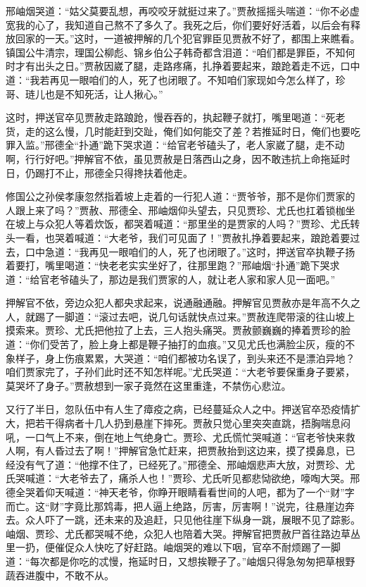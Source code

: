 \documentclass[12pt,oneside]{book}
\begin{document}
邢岫烟哭道：“姑父莫要乱想，再咬咬牙就挺过来了。”贾赦摇摇头喘道：“你不必虚宽我的心了，我知道自己熬不了多久了。我死之后，你们要好好活着，以后会有释放回家的一天。”这时，一道被押解的几个犯官罪臣见贾赦不好了，都围上来瞧看。镇国公牛清宗，理国公柳彪、锦乡伯公子韩奇都含泪道：“咱们都是罪臣，不知何时才有出头之日。”贾赦因崴了腿，走路疼痛，扎挣着要起来，踉跄着走不远，口中道：“我若再见一眼咱们的人，死了也闭眼了。不知咱们家现如今怎么样了，珍哥、琏儿也是不知死活，让人揪心。”

这时，押送官卒见贾赦走路踉跄，慢吞吞的，执起鞭子就打，嘴里喝道：“死老货，走的这么慢，几时能赶到交趾，俺们如何能交了差？若推延时日，俺们也要吃罪入监。”邢德全“扑通”跪下哭求道：“给官老爷磕头了，老人家崴了腿，走不动啊，行行好吧。”押解官不依，虽见贾赦是日落西山之身，因不敢违抗上命拖延时日，仍踢打不止，邢德全只得搀扶着他走。

修国公之孙侯孝康忽然指着坡上走着的一行犯人道：“贾爷爷，那不是你们贾家的人跟上来了吗？”贾赦、邢德全、邢岫烟仰头望去，只见贾珍、尤氏也扛着锁枷坐在坡上与众犯人等着炊饭，都哭着喊道：“那里坐的是贾家的人吗？”贾珍、尤氏转头一看，也哭着喊道：“大老爷，我们可见面了！”贾赦扎挣着要起来，踉跄着要过去，口中急道：“我再见一眼咱们的人，死了也闭眼了。”这时，押送官卒执鞭子扬着要打，嘴里喝道：“快老老实实坐好了，往那里跑？”邢岫烟“扑通”跪下哭求道：“给官老爷磕头了，那边是我们贾家的人，就让老人家和家人见一面吧。”

押解官不依，旁边众犯人都央求起来，说通融通融。押解官见贾赦亦是年高不久之人，就踢了一脚道：“滚过去吧，说几句话就快点过来。”贾赦连爬带滚的往山坡上摸索来。贾珍、尤氏把他拉了上去，三人抱头痛哭。贾赦颤巍巍的捧着贾珍的脸道：“你们受苦了，脸上身上都是鞭子抽打的血痕。”又见尤氏也满脸尘灰，瘦的不象样子，身上伤痕累累，大哭道：“咱们都被功名误了，到头来还不是漂泊异地？咱们贾家完了，子孙们此时还不知怎样呢。”尤氏哭道：“大老爷要保重身子要紧，莫哭坏了身子。”贾赦想到一家子竟然在这里重逢，不禁伤心悲泣。

又行了半日，忽队伍中有人生了瘴疫之病，已经蔓延众人之中。押送官卒恐疫情扩大，把若干得病者十几人扔到悬崖下摔死。贾赦只觉心里突突直跳，捂胸喘息闷吼，一口气上不来，倒在地上气绝身亡。贾珍、尤氏慌忙哭喊道：“官老爷快来救人啊，有人昏过去了啊！”押解官急忙赶来，把贾赦抬到这边来，摸了摸鼻息，已经没有气了道：“他撑不住了，已经死了。”邢德全、邢岫烟悲声大放，对贾珍、尤氏哭喊道：“大老爷去了，痛杀人也！”贾珍、尤氏听见都悲恸欲绝，嚎啕大哭。邢德全哭着仰天喊道：“神天老爷，你睁开眼睛看看世间的人吧，都为了一个“财”字而亡。这“财”字竟比那鸩毒，把人逼上绝路，厉害，厉害啊！”说完，往悬崖边奔去。众人吓了一跳，还未来的及追赶，只见他往崖下纵身一跳，展眼不见了踪影。岫烟、贾珍、尤氏都哭喊不绝，众犯人也陪着大哭。押解官把贾赦尸首往路边草丛里一扔，便催促众人快吃了好赶路。岫烟哭的难以下咽，官卒不耐烦踢了一脚道：“每次都是你吃的忒慢，拖延时日，又想挨鞭子了。”岫烟只得急匆匆把草根野蔬吞进腹中，不敢不从。
\end{document}
